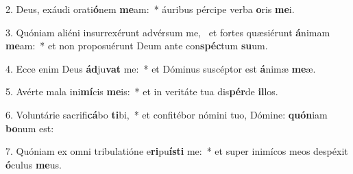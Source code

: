 2. Deus, exáudi orati\textbf{ó}nem \textbf{me}am:~*  áuribus pércipe verba \textbf{o}ris \textbf{me}i.\

3. Quóniam aliéni insurrexérunt advérsum me, \dag\  et fortes quæsiérunt \textbf{á}nimam \textbf{me}am:~*  et non proposuérunt Deum ante con\textbf{spéc}tum \textbf{su}um.\

4. Ecce enim Deus \textbf{ád}ju\textbf{vat} me:~*  et Dóminus suscéptor est \textbf{á}nimæ \textbf{me}æ.\

5. Avérte mala ini\textbf{mí}cis \textbf{me}is:~*  et in veritáte tua dis\textbf{pér}de \textbf{il}los.\

6. Voluntárie sacrifi\textbf{cá}bo \textbf{ti}bi,~*  et confitébor nómini tuo, Dómine: \textbf{quón}iam \textbf{bo}num est:\

7. Quóniam ex omni tribulatióne e\textbf{ri}pu\textbf{ís}\textbf{ti} me:~*  et super inimícos meos despéxit \textbf{ó}culus \textbf{me}us.\

